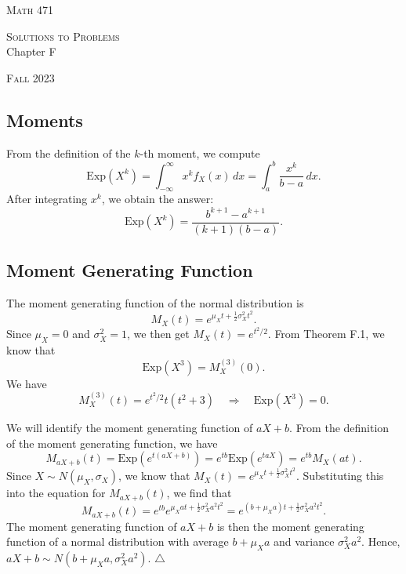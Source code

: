 


\hrulefill

\begin{minipage}{0.33\textwidth}
\textsc{Math 471}
\end{minipage} \hfill 
\begin{minipage}{0.32\textwidth}
\centering
\textsc{Solutions to Problems} \\
Chapter F
\end{minipage}
 \hfill 
 \begin{minipage}{0.33\textwidth}
 \flushright \textsc{Fall 2023}
 \end{minipage}

\hrulefill

\setcounter{section}{6}

\subsection{Moments}

\begin{problem}
From the definition of the $k$-th moment, we compute
    \[
        \mathrm{Exp} (X^k) = \int_{-\infty}^\infty x^k f_X (x) \, dx = \int_a^b \frac{x^k}{b - a} \, dx .
    \]
After integrating $x^k$, we obtain the answer:
    \[
        \mathrm{Exp} (X^k) = \frac{b^{k + 1} - a^{k + 1}}{(k + 1) (b - a)} . \tag*{$\triangle$}
    \]
\end{problem}

\subsection{Moment Generating Function}

\begin{problem}
The moment generating function of the normal distribution is
    \[
        M_X (t) = e^{\mu_X t + \frac{1}{2}\sigma_X^2 t^2} .
    \]
Since $\mu_X = 0$ and $\sigma_X^2 = 1$, we then get $M_X (t) = e^{t^2/2}$. From Theorem F.1, we know that
    \[
        \mathrm{Exp} (X^3 ) = M_X^{(3)} (0) .
    \]
We have
    \[
        M_X^{(3)} (t) = e^{t^2/2} t (t^2 + 3) \quad \Rightarrow \quad \mathrm{Exp} (X^3) = 0 .\tag*{$\triangle$}
    \]
\end{problem}

\begin{problem}
We will identify the moment generating function of $aX + b$. From the definition of the moment generating function, we have
    \[  
        M_{aX + b} (t) = \mathrm{Exp} (e^{t(aX + b)}) = e^{tb} \mathrm{Exp} (e^{taX}) = e^{tb} M_X (at ) .
    \]
Since $X \sim N (\mu_X , \sigma_X )$, we know that $M_X (t) = e^{\mu_X t + \frac{1}{2} \sigma_X^2 t^2}$. Substituting this into the equation for $M_{aX + b} (t)$, we find that
    \[
        M_{aX + b} (t) = e^{tb} e^{\mu_X at + \frac{1}{2} \sigma_X^2 a^2 t^2} = e^{(b + \mu_X a) t + \frac{1}{2} \sigma_X^2 a^2 t^2} .
    \]
The moment generating function of $aX + b$ is then the moment generating function of a normal distribution with average $b + \mu_X a$ and variance $\sigma_X^2 a^2$. Hence, $aX + b \sim N (b + \mu_X a , \sigma_X^2 a^2 )$. \hfill $\triangle$
\end{problem}

